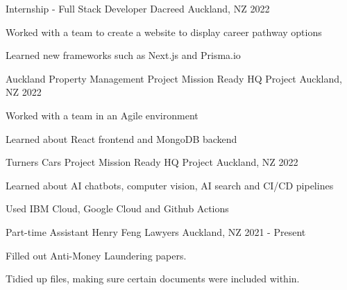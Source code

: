 

\begin{cventries}
\cventry
{Internship - Full Stack Developer} %
{Dacreed} %
{Auckland, NZ} %
{2022} %
{
  \begin{cvitems} %
    \item {Worked with a team to create a website to display career pathway options}
    \item {Learned new frameworks such as Next.js and Prisma.io}
  \end{cvitems}
}

\cventry
{Auckland Property Management Project} %
{Mission Ready HQ Project} %
{Auckland, NZ} %
{2022} %
{
  \begin{cvitems} %
    \item {Worked with a team in an Agile environment}
    \item {Learned about React frontend and MongoDB backend}
  \end{cvitems}
}

\cventry
{Turners Cars Project} %
{Mission Ready HQ Project} %
{Auckland, NZ} %
{2022} %
{
  \begin{cvitems} %
    \item {Learned about AI chatbots, computer vision, AI search and CI/CD pipelines}
    \item {Used IBM Cloud, Google Cloud and Github Actions}
  \end{cvitems}
}

  \cventry
    {Part-time Assistant} %
    {Henry Feng Lawyers} %
    {Auckland, NZ} %
    {2021 - Present} %
    {
      \begin{cvitems} %
        \item {Filled out Anti-Money Laundering papers.}
        \item {Tidied up files, making sure certain documents were included within.}
      \end{cvitems}
    }


\end{cventries}
